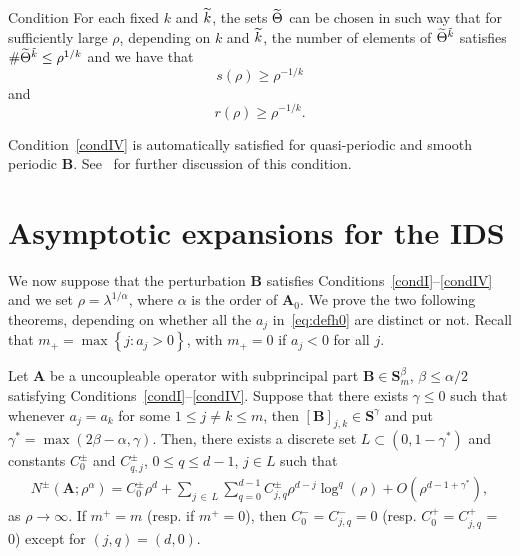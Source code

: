 \documentclass[AHL,Unicode,longabstracts,published]{cedram}
\newcommand{\BA}{\mathbf A}
\newcommand{\BB}{\mathbf B}
\newcommand{\BS}{\mathbf S}
\newcommand{\pd}{uncoupleable}
\newcommand{\bigo}[1]{O\left(#1 \right)}
\newcommand{\set}[1]{\left\{ #1 \right\}}
\let\oldtilde\tilde
\renewcommand*{\tilde}[1]{\mathchoice{\widetilde{#1}}{\widetilde{#1}}{\oldtilde{#1}}{\oldtilde{#1}}}
\begin{document}
\begin{enonce}{Condition}\label{condIV}
For each fixed $k$ and $\tilde k$, the sets $\tilde \Theta$ can be chosen in such way that for sufficiently large $\rho$, depending on $k$ and $\tilde k$, the number of elements of $\tilde \Theta^{\tilde k}$ satisfies $\#\tilde \Theta^{\tilde k} \le \rho^{1/k}$ and we have that
\begin{equation}\label{eq:boundons}
s(\rho) \ge \rho^{-1/k}
\end{equation}
and
\begin{equation}\label{eq:boundonr}
r(\rho) \ge \rho^{-1/k}.
\end{equation}
\end{enonce}

\begin{rema}
Condition~\ref{condIV} is automatically satisfied for quasi-periodic and smooth periodic $\BB$. See~\cite{ParSht2012} for further discussion of this condition.
\end{rema}


\section{Asymptotic expansions for the IDS} \label{sec:asyexp}
We now suppose that the perturbation $\BB$ satisfies Conditions~\ref{condI}--\ref{condIV} and we set $\rho = \lambda^{1/\alpha}$, where $\alpha$ is the order of $\BA_0$. We prove the two following theorems, depending on whether all the $a_j$ in~\eqref{eq:defh0} are distinct or not. Recall that $m_+ = \max \set{j : a_j > 0}$, with $m_+ = 0$ if $a_j < 0$ for all $j$.
\begin{theo} \label{thm:aexpconcretecut}
Let $\BA$ be a \pd{} operator with subprincipal part $\BB \in \BS^{\beta}_m$, $\beta \le \alpha/2$ satisfying Conditions~\ref{condI}--\ref{condIV}. Suppose that there exists $\gamma \le 0$ such that whenever $a_j = a_k$ for some $1 \le j \ne k \le m$, then $[\BB]_{j,k} \in \BS^{\gamma}$ and put $\gamma^* = \max(2 \beta - \alpha, \gamma)$. Then, there exists a discrete set $L \subset (0,1 - \gamma^*)$ and constants $C_0^\pm$ and $C_{q,j}^\pm$, $0 \le q \le d-1$, $j \in L$ such that
\begin{equation}\label{eq:asymptoticsconcretecut}
\begin{aligned}
N^\pm\left(\BA; \rho^\alpha \right) = C_0^\pm \rho^d + \sum_{j\,\in\,L}\sum_{q =0}^{d-1} C_{j,q}^\pm \rho^{d-j} \log^q(\rho) + \bigo{\rho^{d - 1 + \gamma^*}},
\end{aligned}
\end{equation}
as $\rho \to \infty$. If $m^+ = m$ (resp. if $m^+ = 0$), then $C_0^- = C^-_{j,q} = 0$ (resp. $C_0^+ = C^+_{j,q}$ = 0) except for $(j,q) = (d,0)$.
\end{theo}
\end{document}
